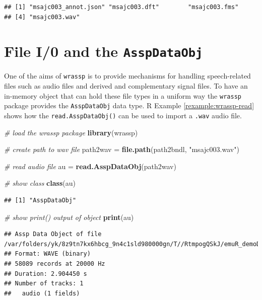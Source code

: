 \documentclass[]{book}
\newenvironment{Shaded}{\begin{snugshade}}{\end{snugshade}}
\newcommand{\CommentTok}[1]{\textcolor[rgb]{0.56,0.35,0.01}{\textit{#1}}}
\newcommand{\KeywordTok}[1]{\textcolor[rgb]{0.13,0.29,0.53}{\textbf{#1}}}
\newcommand{\NormalTok}[1]{#1}
\newcommand{\StringTok}[1]{\textcolor[rgb]{0.31,0.60,0.02}{#1}}
\theoremstyle{definition}
\theoremstyle{definition}
\theoremstyle{definition}
\theoremstyle{remark}
\begin{document}
\begin{verbatim}
## [1] "msajc003_annot.json" "msajc003.dft"        "msajc003.fms"       
## [4] "msajc003.wav"
\end{verbatim}

\hypertarget{file-i0-and-the-asspdataobj}{%
\section{\texorpdfstring{File I/0 and the
\texttt{AsspDataObj}}{File I/0 and the AsspDataObj}}\label{file-i0-and-the-asspdataobj}}

One of the aims of \texttt{wrassp} is to provide mechanisms for handling
speech-related files such as audio files and derived and complementary
signal files. To have an in-memory object that can hold these file types
in a uniform way the \texttt{wrassp} package provides the
\texttt{AsspDataObj} data type. R Example \ref{rexample:wrassp-read}
shows how the \texttt{read.AsspDataObj()} can be used to import a
\texttt{.wav} audio file.

\begin{Shaded}
\begin{Highlighting}[]
\CommentTok{# load the wrassp package}
\KeywordTok{library}\NormalTok{(wrassp)}

\CommentTok{# create path to wav file}
\NormalTok{path2wav =}\StringTok{ }\KeywordTok{file.path}\NormalTok{(path2bndl, }\StringTok{"msajc003.wav"}\NormalTok{)}

\CommentTok{# read audio file}
\NormalTok{au =}\StringTok{ }\KeywordTok{read.AsspDataObj}\NormalTok{(path2wav)}

\CommentTok{# show class}
\KeywordTok{class}\NormalTok{(au)}
\end{Highlighting}
\end{Shaded}

\begin{verbatim}
## [1] "AsspDataObj"
\end{verbatim}

\begin{Shaded}
\begin{Highlighting}[]
\CommentTok{# show print() output of object}
\KeywordTok{print}\NormalTok{(au)}
\end{Highlighting}
\end{Shaded}

\begin{verbatim}
## Assp Data Object of file /var/folders/yk/8z9tn7kx6hbcg_9n4c1sld980000gn/T//RtmpogQSkJ/emuR_demoData/ae_emuDB/0000_ses/msajc003_bndl/msajc003.wav.
## Format: WAVE (binary)
## 58089 records at 20000 Hz
## Duration: 2.904450 s
## Number of tracks: 1 
##   audio (1 fields)
\end{verbatim}
\end{document}
